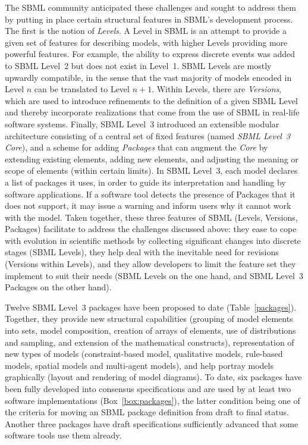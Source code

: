 \documentclass[]{draft-sbml-paper}
\begin{document}
The SBML community anticipated these challenges and sought to address them by putting in place certain structural features in SBML's development process.  The first is the notion of \emph{Levels}.  A Level in SBML is an attempt to provide a given set of features for describing models, with higher Levels providing more powerful features.  For example, the ability to express discrete events was added to SBML Level~2 but does not exist in Level~1.  SBML Levels are mostly upwardly compatible, in the sense that the vast majority of models encoded in Level $n$ can be translated to Level $n+1$.  Within Levels, there are \emph{Versions}, which are used to introduce refinements to the definition of a given SBML Level and thereby incorporate realizations that come from the use of SBML in real-life software systems.  Finally, SBML Level~3 introduced an extensible modular architecture consisting of a central set of fixed features (named \emph{SBML Level~3 Core}), and a scheme for adding \emph{Packages} that can augment the \emph{Core} by extending existing elements, adding new elements, and adjusting the meaning or scope of elements (within certain limits).  In SBML Level~3, each model declares a list of packages it uses, in order to guide its interpretation and handling by software applications.  If a software tool detects the presence of Packages that it does not support, it may issue a warning and inform users why it cannot work with the model.  Taken together, these three features of SBML (Levels, Versions, Packages) facilitate to address the challenges discussed above: they ease to cope with evolution in scientific methods by collecting significant changes into discrete stages (SBML Levels), they help deal with the inevitable need for revisions (Versions within Levels), and they allow developers to limit the feature set they implement to suit their needs (SBML Levels on the one hand, and SBML Level~3 Packages on the other hand).

Twelve SBML Level~3 packages have been proposed to date (Table~\ref{packages}). Together, they provide new structural capabilities (grouping of model elements into sets, model composition, creation of arrays of elements, use of distributions and sampling, and extension of the mathematical constructs), representation of new types of models (constraint-based model, qualitative models, rule-based models, spatial models and multi-agent models), and help portray models graphically (layout and rendering of model diagrams).  To date, six packages have been fully developed into consensus specifications and are used by at least two software implementations (Box~\ref{box:packages}), the latter condition being one of the criteria for moving an SBML package definition from draft to final status. Another three packages have draft specifications sufficiently advanced that some software tools use them already.
\end{document}
